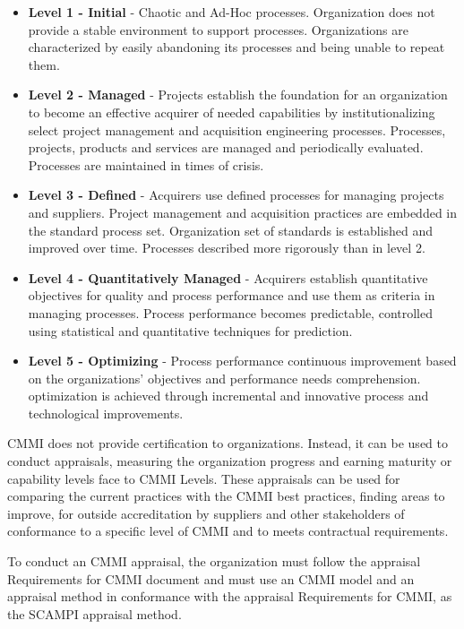 \begin{itemize}

\item \textbf{Level 1 - Initial} - Chaotic and Ad-Hoc processes. Organization does not provide a stable environment to support processes. Organizations are characterized by easily abandoning its processes and being unable to repeat them.

\item \textbf{Level 2 - Managed} - Projects establish the foundation for an organization to become an effective acquirer of needed capabilities by institutionalizing select project management and acquisition engineering processes. Processes, projects, products and services are managed and periodically evaluated. Processes are maintained in times of crisis.

\item \textbf{Level 3 - Defined} - Acquirers use defined processes for managing projects and suppliers. Project management and acquisition practices are embedded in the standard process set. Organization set of standards is established and improved over time. Processes described more rigorously than in level 2.

\item \textbf{Level 4 - Quantitatively Managed} - Acquirers establish quantitative objectives for quality and process performance and use them as criteria in managing processes. Process performance becomes predictable, controlled using statistical and quantitative techniques for prediction.

\item \textbf{Level 5 - Optimizing} - Process performance continuous improvement based on the organizations' objectives and performance needs comprehension. optimization is achieved through incremental and innovative process and technological improvements.

\end{itemize}

CMMI does not provide certification to organizations. Instead, it can be used to conduct appraisals, measuring the organization progress and earning maturity or capability levels face to CMMI Levels. These appraisals can be used for comparing the current practices with the CMMI best practices, finding areas to improve, for outside accreditation by suppliers and other stakeholders of conformance to a specific level of CMMI and to meets contractual requirements.\par
To conduct an CMMI appraisal, the organization must follow the appraisal Requirements for CMMI document \cite{appraisalReqs} and must use an CMMI model and an appraisal method in conformance with the appraisal Requirements for CMMI, as the SCAMPI appraisal method\cite{Scampi}.\par


